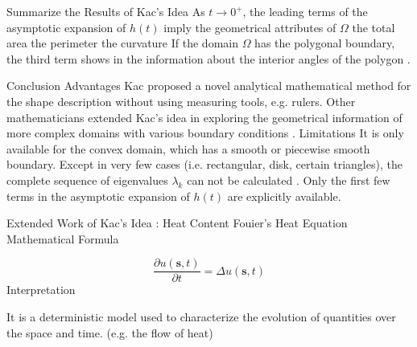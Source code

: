 \documentclass{article}
\begin{document}
\begin{outline}[enumerate]
    \2 Summarize the Results of Kac's Idea
      \3 As $t \rightarrow 0^{+}$, the leading terms of the asymptotic expansion of $h(t)$ imply the geometrical attributes of $\Omega$
        \4 the total area
        \4 the perimeter
        \4 the curvature
      \3 If the domain $\Omega$ has the polygonal boundary, the third term shows in the information about the interior angles of the polygon \cite{grieser2013hearing}.

   \2 Conclusion
      \3 Advantages
        \4 Kac proposed a novel analytical mathematical method for the shape description without using measuring tools, e.g. rulers.
        \4 Other mathematicians extended Kac's idea in exploring the geometrical information of more complex domains with various boundary conditions \cite{khabou2007shape}\cite{gottlieb1985eigenvalues}\cite{gottlieb1983hearing} \cite{zayed1989heat}\cite{sleeman1984trace}.  
     \3 Limitations
        \4 It is only available for the convex domain, which has a smooth or piecewise smooth boundary.  
        \4 Except in very few cases (i.e. rectangular, disk, certain triangles), the complete sequence of eigenvalues $\lambda_k$ can not be calculated \cite{grieser2013hearing}.
        \4 Only the first few terms in the asymptotic expansion of $h(t)$ are explicitly available.

        \newpage
        
  \1 Extended Work of Kac’s Idea \cite{desjardins1994heat}\cite{vandenberg1994heat}: Heat Content
    \2 Fouier's Heat Equation \cite{baron1878analytical}
      \3 Mathematical Formula
        \par
        \begin{equation}\label{eq:heat_eq}
          \frac{\partial u(\bm{s}, t)}{\partial t} = \Delta u(\bm{s}, t)
        \end{equation}
      \3 Interpretation
      \par
      It is a deterministic model used to characterize the evolution of quantities over the space and time. (e.g. the flow of heat)


\end{outline}
\end{document}
